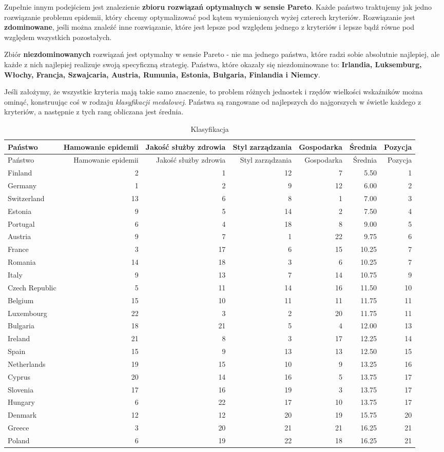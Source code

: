 \documentclass[
]{article}
\begin{document}
Zupełnie innym podejściem jest znalezienie \textbf{zbioru rozwiązań
optymalnych w sensie Pareto}. Każde państwo traktujemy jak jedno
rozwiązanie problemu epidemii, który chcemy optymalizować pod kątem
wymienionych wyżej czterech kryteriów. Rozwiązanie jest
\textbf{zdominowane}, jeśli można znaleźć inne rozwiązanie, które jest
lepsze pod względem jednego z kryteriów i lepsze bądź równe pod względem
wszystkich pozostałych.

Zbiór \textbf{niezdominowanych} rozwiązań jest optymalny w sensie Pareto
- nie ma jednego państwa, które radzi sobie absolutnie najlepiej, ale
każde z nich najlepiej realizuje swoją specyficzną strategię. Państwa,
które okazały się niezdominowane to: \textbf{Irlandia, Luksemburg,
Włochy, Francja, Szwajcaria, Austria, Rumunia, Estonia, Bułgaria,
Finlandia i Niemcy}.

Jeśli założymy, że wszystkie kryteria mają takie samo znaczenie, to
problem różnych jednostek i rzędów wielkości wskaźników można ominąć,
konstruując coś w rodzaju \emph{klasyfikacji medalowej}. Państwa są
rangowane od najlepszych do najgorszych w świetle każdego z kryteriów, a
następnie z tych rang obliczana jest średnia.

\begin{longtable}[]{@{}lrrrrrr@{}}
\caption{Klasyfikacja}\tabularnewline
\toprule
Państwo & Hamowanie epidemii & Jakość służby zdrowia & Styl zarządzania
& Gospodarka & Średnia & Pozycja\tabularnewline
\midrule
\endfirsthead
\toprule
Państwo & Hamowanie epidemii & Jakość służby zdrowia & Styl zarządzania
& Gospodarka & Średnia & Pozycja\tabularnewline
\midrule
\endhead
Finland & 2 & 1 & 12 & 7 & 5.50 & 1\tabularnewline
Germany & 1 & 2 & 9 & 12 & 6.00 & 2\tabularnewline
Switzerland & 13 & 6 & 8 & 1 & 7.00 & 3\tabularnewline
Estonia & 9 & 5 & 14 & 2 & 7.50 & 4\tabularnewline
Portugal & 6 & 4 & 18 & 8 & 9.00 & 5\tabularnewline
Austria & 9 & 7 & 1 & 22 & 9.75 & 6\tabularnewline
France & 3 & 17 & 6 & 15 & 10.25 & 7\tabularnewline
Romania & 14 & 18 & 3 & 6 & 10.25 & 7\tabularnewline
Italy & 9 & 13 & 7 & 14 & 10.75 & 9\tabularnewline
Czech Republic & 5 & 11 & 14 & 16 & 11.50 & 10\tabularnewline
Belgium & 15 & 10 & 11 & 11 & 11.75 & 11\tabularnewline
Luxembourg & 22 & 3 & 2 & 20 & 11.75 & 11\tabularnewline
Bulgaria & 18 & 21 & 5 & 4 & 12.00 & 13\tabularnewline
Ireland & 21 & 8 & 3 & 17 & 12.25 & 14\tabularnewline
Spain & 15 & 9 & 13 & 13 & 12.50 & 15\tabularnewline
Netherlands & 19 & 15 & 10 & 9 & 13.25 & 16\tabularnewline
Cyprus & 20 & 14 & 16 & 5 & 13.75 & 17\tabularnewline
Slovenia & 17 & 16 & 19 & 3 & 13.75 & 17\tabularnewline
Hungary & 6 & 22 & 17 & 10 & 13.75 & 17\tabularnewline
Denmark & 12 & 12 & 20 & 19 & 15.75 & 20\tabularnewline
Greece & 3 & 20 & 21 & 21 & 16.25 & 21\tabularnewline
Poland & 6 & 19 & 22 & 18 & 16.25 & 21\tabularnewline
\bottomrule
\end{longtable}
\end{document}
